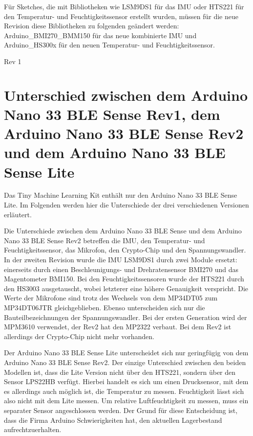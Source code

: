 Für Sketches, die mit Bibliotheken wie LSM9DS1 für das IMU oder HTS221 für den Temperatur- und Feuchtigkeitssensor erstellt wurden, müssen für die neue Revision diese Bibliotheken zu folgenden geändert werden: Arduino\_BMI270\_BMM150 für das neue kombinierte IMU und Arduino\_HS300x für den neuen Temperatur- und Feuchtigkeitssensor.


Rev 1



\section{Unterschied zwischen dem Arduino Nano 33 BLE Sense Rev1, dem Arduino Nano 33 BLE Sense Rev2 und dem Arduino Nano 33 BLE Sense Lite}

Das Tiny Machine Learning Kit enthält nur den Arduino Nano 33 BLE Sense  Lite. Im Folgenden werden hier die Unterschiede der drei verschiedenen Versionen erläutert.  

\bigskip

Die Unterschiede zwischen dem Arduino Nano 33 BLE Sense und dem Arduino Nano 33 BLE Sense Rev2 betreffen die IMU, den Temperatur- und Feuchtigkeitssensor, das Mikrofon, den Crypto-Chip und den Spannungswandler. In der zweiten Revision wurde die IMU LSM9DS1 durch zwei Module ersetzt: einerseits durch einen Beschleunigungs- und Drehratensensor BMI270 und das Magentometer  BMI150. Bei den Feuchtigkeitssensoren wurde der HTS221 durch den HS3003 ausgetauscht, wobei letzterer eine höhere Genauigkeit verspricht. Die Werte der Mikrofone sind trotz des Wechsels von dem MP34DT05 zum MP34DT06JTR gleichgeblieben. Ebenso unterscheiden sich nur die Bauteilbezeichnungen der Spannungswandler. Bei der ersten Generation wird der MPM3610 verwendet, der Rev2 hat den MP2322 verbaut. Bei dem Rev2 ist allerdings der Crypto-Chip nicht mehr vorhanden.

\bigskip

Der Arduino Nano 33 BLE Sense Lite unterscheidet sich nur geringfügig von dem Arduino Nano 33 BLE Sense Rev2. Der einzige Unterschied zwischen den beiden Modellen ist, dass die Lite Version nicht über den HTS221, sondern über den Sensor LPS22HB verfügt. Hierbei  handelt es sich um einen Drucksensor, mit dem es allerdings auch möglich ist, die Temperatur zu messen. Feuchtigkeit lässt sich also nicht mit dem Lite messen. Um relative Luftfeuchtigkeit zu messen, muss ein separater Sensor angeschlossen werden. Der Grund für diese Entscheidung ist, dass die Firma Arduino Schwierigkeiten hat, den aktuellen Lagerbestand aufrechtzuerhalten. \cite{Filipi:2022}





